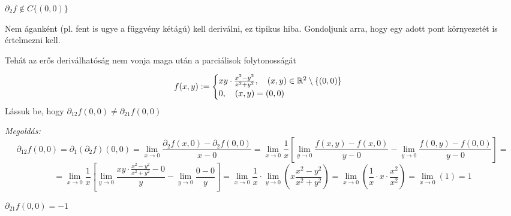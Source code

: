 \documentclass[a4paper,11.5pt]{article}
\begin{document}
	\begin{exercise}
		$\partial_2f\notin C\{(0,0)\}$
	\end{exercise}
	\begin{note}
		Nem áganként (pl. fent is ugye a függvény kétágú) kell deriválni, ez tipikus hiba. Gondoljunk arra, hogy egy adott pont környezetét is értelmezni kell.
	\end{note}
	\begin{note}
		Tehát az erős deriválhatóság nem vonja maga után a parciálisok folytonosságát
	\end{note}
	\begin{task}
		\[ f(x,y):=\begin{cases}
			xy\cdot\frac{x^2-y^2}{x^2+y^2},\quad (x,y)\in \mathbb{R}^2\setminus\{(0,0)\}\\
			0,\quad (x,y)=(0,0)
		\end{cases} \]
		Lássuk be, hogy $\partial_{12}f(0,0)\not=\partial_{21}f(0,0)$
		
		\textit{Megoldás:}
		\[ \partial_{12}f(0,0)=\partial_1(\partial_2f)(0,0)=\lim_{x\to0}\frac{\partial_2f(x,0)-\partial_2f(0,0)}{x-0}=\lim_{x\to0}\frac{1}{x}\left[\lim_{y\to0}\frac{f(x,y)-f(x,0)}{y-0}-\lim_{y\to0}\frac{f(0,y)-f(0,0)}{y-0}\right]= \]
		\[= \lim_{x\to0}\frac{1}{x}\left[\lim_{y\to0}\frac{xy\cdot\frac{x^2-y^2}{x^2+y^2}-0}{y}-\lim_{y\to0}\frac{0-0}{y}\right]=\lim_{x\to0}\frac{1}{x}\cdot\lim_{y\to0}\left(x\frac{x^2-y^2}{x^2+y^2}\right)=\lim_{x\to0}\left(\frac{1}{x}\cdot x\cdot\frac{x^2}{x^2}\right)=\lim_{x\to0}(1)=1 \]
	\end{task}
	\begin{exercise}
		$\partial_{21}f(0,0)=-1$
	\end{exercise}
\end{document}
